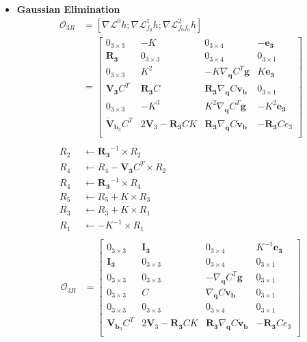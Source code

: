 \documentclass[]{article}
\begin{document}
\begin{itemize}
	\item \textbf{Gaussian Elimination}
	\begin{align*}
	\mathcal{O}_{3R} &= [\nabla\mathcal{L}^0h;\nabla\mathcal{L}^1_{f_0}h;\nabla\mathcal{L}^2_{f_0f_0}h]\\ 
	&= \begin{bmatrix}
	0_{3\times 3}& -K& 0_{3\times 4}& -\bm{e_3}\\
	\bm{R_3} & 0_{3\times 3} & 0_{3\times 4} & 0_{3\times 1}\\
	0_{3\times 3}& K^2& -K\nabla_{\bm{q}} C^T\bm{g}& K\bm{e_3}\\
	\bm{V_3} C^T & \bm{R_3}C & \bm{R_3}\nabla_{\bm{q}} C\bm{v_b} & 0_{3\times 1}\\
	0_{3\times 3}& -K^3& K^2\nabla_{\bm{q}} C^T\bm{g}& -K^2\bm{e_3}\\
	\bm{\dot{V}}_{\bm{b}_3} C^T & 2\bm{V}_3 - \bm{R_3}CK & \bm{R_3}\nabla_{\bm{q}} C\bm{\dot{v}_b} & -\bm{R_3}Ce_3\\
	\end{bmatrix}\\
	\\
	R_2&\leftarrow \bm{R_3}^{-1}\times R_2\\
	R_4&\leftarrow R_4 - \bm{V_3}C^T\times R_2\\
	R_4&\leftarrow \bm{R_3}^{-1}\times R_4\\
	R_5&\leftarrow R_5 + K\times R_3\\
	R_3&\leftarrow R_3 + K\times R_1\\	
	R_1&\leftarrow -K^{-1}\times R_1\\
	\end{align*}
	\begin{align*}
	\mathcal{O}_{3R} &= \begin{bmatrix}
	0_{3\times 3}& \bm{I_3}& 0_{3\times 4}& K^{-1}\bm{e_3}\\
	\bm{I_3} & 0_{3\times 3} & 0_{3\times 4} & 0_{3\times 1}\\
	0_{3\times 3}& 0_{3\times 3}& -\nabla_{\bm{q}} C^T\bm{g}& 0_{3\times 1}\\
	0_{3\times 3} & C & \nabla_{\bm{q}} C\bm{v_b} & 0_{3\times 1}\\
	0_{3\times 3}& 	0_{3\times 3}& 	0_{3\times 4}& 	0_{3\times 1}\\
	\bm{\dot{V}}_{\bm{b}_3} C^T & 2\bm{V}_3 - \bm{R_3}CK & \bm{R_3}\nabla_{\bm{q}} C\bm{\dot{v}_b} & -\bm{R_3}Ce_3\\
	\end{bmatrix}\\
	\\

\end{align*}
\end{itemize}
\end{document}

